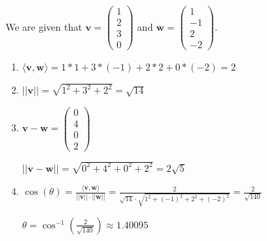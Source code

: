 \documentclass[12pt]{article}
\begin{document}
  \item
  We are given that $\mathbf{v} = \begin{pmatrix}
    1\\
    2\\
    3\\
    0
  \end{pmatrix}$ and
  $\mathbf{w} = \begin{pmatrix}
    1\\
    -1\\
    2\\
    -2
  \end{pmatrix}$.
  \begin{enumerate}[leftmargin=!]
    \item $\langle \mathbf{v} , \mathbf{w} \rangle = 1 * 1 + 3 * (-1) + 2 * 2 + 0 * (-2) = 2$

    \item $||\mathbf{v}|| = \sqrt{1^{2} + 3^{2} + 2^{2}} = \sqrt{14}$

    \item $\mathbf{v} - \mathbf{w} = \begin{pmatrix}
      0 \\
      4 \\
      0 \\
      2
    \end{pmatrix}$

    $||\mathbf{v} - \mathbf{w}|| = \sqrt{0^{2} + 4^{2} + 0^{2} + 2^{2}} = 2\sqrt{5}$

    \item $\cos(\theta) = \frac{\langle \mathbf{v}, \mathbf{w} \rangle}{||\mathbf{v}||\cdot||\mathbf{w}||} = \frac{2}{\sqrt{14} \cdot \sqrt{1^{2} + (-1)^{2} + 2^{2} + (-2)^{2}}} = \frac{2}{\sqrt{140}}$ 
    
    $\theta = \cos^{-1}(\frac{2}{\sqrt{140}}) \approx 1.40095$
  \end{enumerate}
\end{document}
